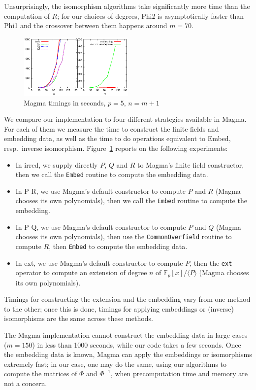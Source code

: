 \documentclass{sig-alternate}
\def\F {\ensuremath{\mathbb{F}}}
\newcounter{algo}
\newcommand{\ang}[1]{\langle#1\rangle}
\begin{document}
Unsurprisingly, the isomorphism algorithms take significantly more
time than the computation of $R$; for our choices of degrees, {\sf
  Phi2} is asymptotically faster than {\sf Phi1} and the crossover
between them happens around $m=70$. 

\begin{figure}
  \centering
  \includegraphics[width=0.5\textwidth]{magma}
  \caption{Magma timings in seconds, $p=5$, $n=m+1$}
  \label{fig:magma}
\vspace{-4ex}
\end{figure}

We compare our implementation to four different strategies available
in Magma. For each of them we measure the time to construct the finite
fields and embedding data, as well as the time to do operations
equivalent to {\sf Embed}, resp.\ inverse
isomorphism. Figure~\ref{fig:magma} reports on the following
experiments:
\begin{itemize}
\item In {\sf irred}, we supply directly $P$, $Q$ and $R$ to Magma's
  finite field constructor, then we call the \verb+Embed+ routine to
  compute the embedding data.
\item In  {\sf P R}, we use Magma's default constructor to compute $P$
  and $R$ (Magma chooses its own polynomials), then we call the
  \verb+Embed+ routine to compute the embedding.
\item In {\sf P Q}, we use Magma's default constructor to compute $P$
  and $Q$ (Magma chooses its own polynomials), then use the
  \verb+CommonOverfield+ routine to compute $R$, then \verb+Embed+ to
  compute the embedding data.
\item In {\sf ext}, we use Magma's default constructor to compute $P$,
  then the \verb+ext+ operator to compute an extension of degree $n$
  of $\F_p[x]/\ang{P}$ (Magma chooses its own polynomials).
\end{itemize}
Timings for constructing the extension and the embedding vary from one
method to the other; once this is done, timings for applying
embeddings or (inverse) isomorphisms are the same across these
methods.

The Magma implementation cannot construct the embedding data in large
cases ($m = 150$) in less than 1000 seconds, while our code takes a
few seconds. Once the embedding data is known, Magma can apply the
embeddings or isomorphisms extremely fast; in our case, one may do the
same, using our algorithms to compute the matrices of $\Phi$ and
$\Phi^{-1}$, when precomputation time and memory are not a concern.



\scriptsize
 
\end{document}
